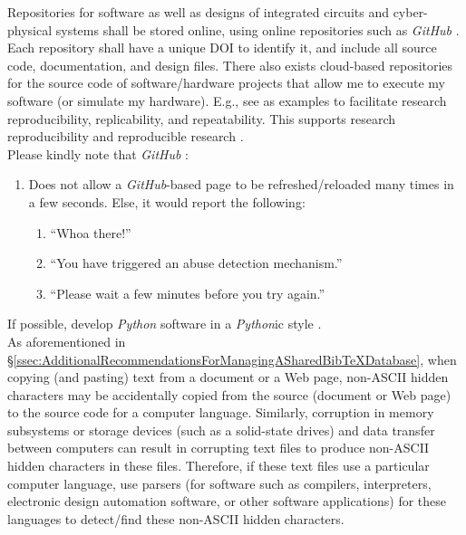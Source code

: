 \documentclass[letter,12pt]{article}
\begin{document}
Repositories for software as well as designs of integrated circuits and cyber-physical systems shall be stored online, using online repositories such as {\it GitHub} \cite{GitHubStaff2016}. Each repository shall have a unique DOI to identify it, and include all source code, documentation, and design files. There also exists cloud-based repositories for the source code of software/hardware projects that allow me to execute my software (or simulate my hardware). E.g., see \cite{CodeOceanstaff2017,RunMyCodeAssociationContributors2013} as examples to facilitate research reproducibility, replicability, and repeatability. This supports research reproducibility and reproducible research \cite{Schiermeier2018,Baumer2017,CodeOceanstaff2017,DatopianAtomaticLtdIncStaff2017,Kim2017,Mailund2017,Barba2016,Gandrud2015,Liberman2015,Creswell2014,Gandrud2014,Stodden2014,RunMyCodeAssociationContributors2013,Blackburn20XY,Geier20XY,Krishnamurthi20XY}. \\

Please kindly note that {\it GitHub} \cite{GitHubStaff2016}: \vspace{-0.3cm}
\begin{enumerate} \itemsep -4pt
\item Does not allow a {\it GitHub}-based page to be refreshed/reloaded many times in a few seconds. Else, it would report the following: \vspace{-0.3cm}
	\begin{enumerate} \itemsep -2pt
	\item ``Whoa there!''
	\item ``You have triggered an abuse detection mechanism.''
	\item ``Please wait a few minutes before you try again.''
	\end{enumerate}
\end{enumerate}



If possible, develop {\it Python} software in a {\it Python}ic style \cite[Chapter 1, pp. 1--12,12--17]{Alchin2010} \cite{Jon2014,Reitz2016a,Reitz2016,Preshing2014,Franca2014,vanRossum2013}. \\



As aforementioned in \S\ref{ssec:AdditionalRecommendationsForManagingASharedBibTeXDatabase}, when copying (and pasting) text from a document or a Web page, non-ASCII hidden characters may be accidentally copied from the source (document or Web page) to the source code for a computer language. Similarly, corruption in memory subsystems or storage devices (such as a solid-state drives) and data transfer between computers can result in corrupting text files to produce non-ASCII hidden characters in these files. Therefore, if these text files use a particular computer language, use parsers (for software such as compilers, interpreters, electronic design automation software, or other software applications) for these languages to detect/find these non-ASCII hidden characters.
\end{document}
